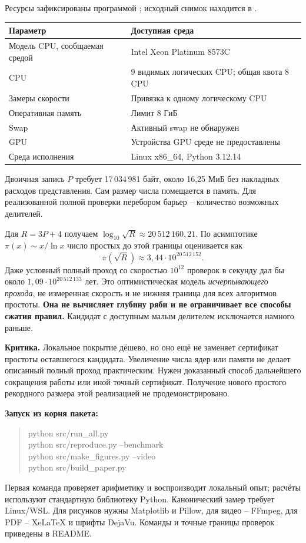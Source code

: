 \documentclass[11pt,a4paper]{article}
\newcommand{\code}[1]{\texttt{\detokenize{#1}}}
\begin{document}
Ресурсы зафиксированы программой \code{src/resource_audit.py}; исходный снимок находится в \code{data/resources.json}.
\begin{center}
\begin{tabularx}{\linewidth}{@{}lX@{}}
\toprule
Параметр & Доступная среда\\
\midrule
Модель CPU, сообщаемая средой & Intel Xeon Platinum 8573C\\
CPU & 9 видимых логических CPU; общая квота 8 CPU\\
Замеры скорости & Привязка к одному логическому CPU\\
Оперативная память & Лимит 8 ГиБ\\
Swap & Активный swap не обнаружен\\
GPU & Устройства GPU среде не предоставлены\\
Среда исполнения & Linux x86\_64, Python 3.12.14\\
\bottomrule
\end{tabularx}
\end{center}

Двоичная запись $P$ требует 17\,034\,981 байт, около 16,25 МиБ без накладных расходов представления. Сам размер числа помещается в память. Для реализованной полной проверки перебором барьер -- количество возможных делителей.

Для $R=3P+4$ получаем $\log_{10}\sqrt R\approx20\,512\,160{,}21$. По асимптотике $\pi(x)\sim x/\ln x$ число простых до этой границы оценивается как
\[
 \pi(\sqrt R)\approx3{,}44\cdot10^{20\,512\,152}.
\]
Даже условный полный проход со скоростью $10^{12}$ проверок в секунду дал бы около $1{,}09\cdot10^{20\,512\,133}$ лет. Это оптимистическая модель \emph{исчерпывающего прохода}, не измеренная скорость и не нижняя граница для всех алгоритмов простоты. \textbf{Она не вычисляет глубину ряби и не ограничивает все способы сжатия правил.} Кандидат с доступным малым делителем исключается намного раньше.

\textbf{Критика.} Локальное покрытие дёшево, но оно ещё не заменяет сертификат простоты оставшегося кандидата. Увеличение числа ядер или памяти не делает описанный полный проход практическим. Нужен доказанный способ дальнейшего сокращения работы или иной точный сертификат. Получение нового простого рекордного размера этой реализацией не продемонстрировано.

\textbf{Запуск из корня пакета:}
\begin{quote}\small\ttfamily
python src/run\_all.py\\
python src/reproduce.py --benchmark\\
python src/make\_figures.py --video\\
python src/build\_paper.py
\end{quote}
Первая команда проверяет арифметику и воспроизводит локальный опыт; расчёты используют стандартную библиотеку Python. Канонический замер требует Linux/WSL. Для рисунков нужны Matplotlib и Pillow, для видео -- FFmpeg, для PDF -- XeLaTeX и шрифты DejaVu. Команды и точные границы проверок приведены в README.
\end{document}
